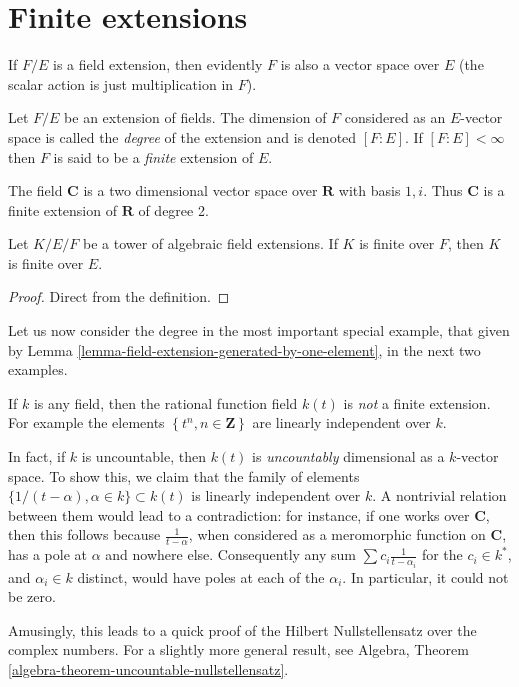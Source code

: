 \section{Finite extensions}
\label{section-finite-extensions}

\noindent
If $F/E$ is a field extension, then evidently $F$ is also a vector space
over $E$ (the scalar action is just multiplication in $F$).

\begin{definition}
\label{definition-degree}
Let $F/E$ be an extension of fields. The dimension of $F$ considered as an
$E$-vector space is called the {\it degree} of the extension and is
denoted $[F : E]$. If $[F : E] < \infty$ then $F$ is said to be a
{\it finite} extension of $E$.
\end{definition}

\begin{example}
\label{example-C-over-R}
The field $\mathbf{C}$ is a two dimensional vector space over $\mathbf{R}$
with basis $1, i$. Thus $\mathbf{C}$ is a finite extension of $\mathbf{R}$
of degree 2.
\end{example}

\begin{lemma}
\label{lemma-finite-goes-up}
Let $K/E/F$ be a tower of algebraic field extensions.
If $K$ is finite over $F$, then $K$ is finite over $E$.
\end{lemma}

\begin{proof}
Direct from the definition.
\end{proof}

\noindent
Let us now consider the degree in the most important special example, that
given by Lemma \ref{lemma-field-extension-generated-by-one-element}, in the
next two examples.

\begin{example}
\label{example-degree-rational-function-field}
If $k$ is any field, then the rational function field $k(t)$ is
{\it not} a finite extension. For example the elements
$\left\{t^n, n \in \mathbf{Z}\right\}$ are linearly independent over $k$.

\medskip\noindent
In fact, if $k$ is uncountable, then $k(t)$ is {\it uncountably} dimensional
as a $k$-vector space. To show this, we claim that the family of elements
$\{1/(t- \alpha), \alpha \in k\} \subset k(t)$ is linearly independent over
$k$. A nontrivial relation between them would lead to a contradiction: for
instance, if one works over $\mathbf{C}$, then this follows because
$\frac{1}{t-\alpha}$, when considered as a meromorphic function on
$\mathbf{C}$, has a pole at $\alpha$ and nowhere else.
Consequently any sum $\sum c_i \frac{1}{t - \alpha_i}$ for the $c_i \in k^*$,
and $\alpha_i \in k$ distinct, would have poles at each of the $\alpha_i$.
In particular, it could not be zero.

\medskip\noindent
Amusingly, this leads to a quick proof of the Hilbert Nullstellensatz over
the complex numbers. For a slightly more general result, see
Algebra, Theorem \ref{algebra-theorem-uncountable-nullstellensatz}.
\end{example}

